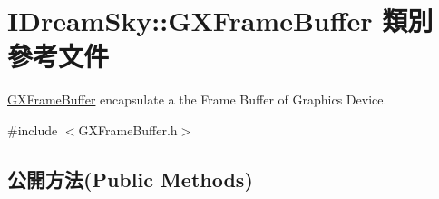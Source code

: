 \hypertarget{class_i_dream_sky_1_1_g_x_frame_buffer}{}\section{I\+Dream\+Sky\+:\+:G\+X\+Frame\+Buffer 類別 參考文件}
\label{class_i_dream_sky_1_1_g_x_frame_buffer}


\hyperlink{class_i_dream_sky_1_1_g_x_frame_buffer}{G\+X\+Frame\+Buffer} encapsulate a the Frame Buffer of Graphics Device.  




{\ttfamily \#include $<$G\+X\+Frame\+Buffer.\+h$>$}

\subsection*{公開方法(Public Methods)}
